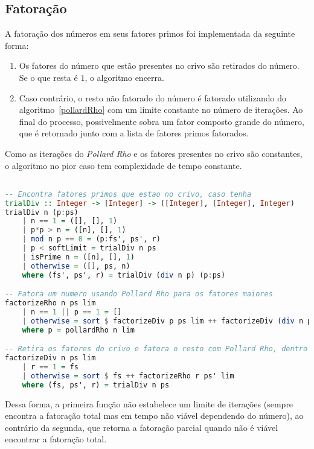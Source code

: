 \documentclass{article}
\begin{document}
\subsection{Fatoração}

A fatoração dos números em seus fatores primos foi implementada da seguinte forma:

\begin{enumerate}
\item Os fatores do número que estão presentes no crivo são retirados do número. Se o que resta é $1$, o algoritmo encerra.
\item Caso contrário, o resto não fatorado do número é fatorado utilizando do algoritmo~\ref{pollardRho} com um limite constante no número de iterações. Ao final do processo, possivelmente sobra um fator composto grande do número, que é retornado junto com a lista de fatores primos fatorados.
\end{enumerate}

Como as iterações do \textit{Pollard Rho} e os fatores presentes no crivo são constantes, o algoritmo no pior caso tem complexidade de tempo constante.

\noindent\hspace{0.03\linewidth}
\begin{minipage}{0.9\linewidth}
\begin{lstlisting}[language=haskell,caption=Fatoração]

-- Encontra fatores primos que estao no crivo, caso tenha
trialDiv :: Integer -> [Integer] -> ([Integer], [Integer], Integer)
trialDiv n (p:ps)
    | n == 1 = ([], [], 1)
    | p*p > n = ([n], [], 1)
    | mod n p == 0 = (p:fs', ps', r)
    | p < softLimit = trialDiv n ps
    | isPrime n = ([n], [], 1)
    | otherwise = ([], ps, n)
    where (fs', ps', r) = trialDiv (div n p) (p:ps)

-- Fatora um numero usando Pollard Rho para os fatores maiores
factorizeRho n ps lim
    | n == 1 || p == 1 = []
    | otherwise = sort $ factorizeDiv p ps lim ++ factorizeDiv (div n p) ps lim
    where p = pollardRho n lim

-- Retira os fatores do crivo e fatora o resto com Pollard Rho, dentro do limite estabelecido
factorizeDiv n ps lim
    | r == 1 = fs
    | otherwise = sort $ fs ++ factorizeRho r ps' lim
    where (fs, ps', r) = trialDiv n ps

\end{lstlisting}
\end{minipage}

Dessa forma, a primeira função não estabelece um limite de iterações (sempre encontra a fatoração total mas em tempo não viável dependendo do número), ao contrário da segunda, que retorna a fatoração parcial quando não é viável encontrar a fatoração total.  
\end{document}

